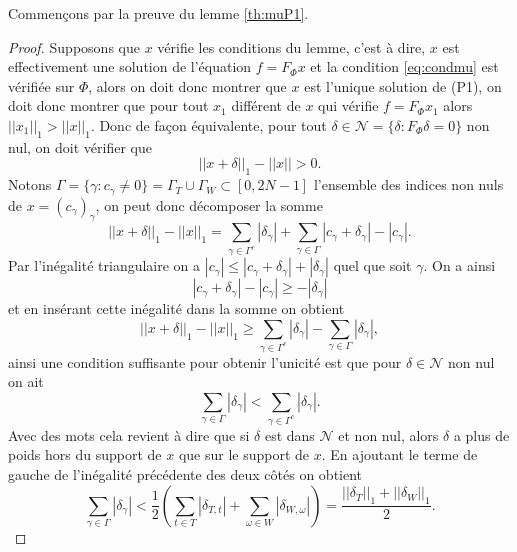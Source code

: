 	Commençons par la preuve du lemme \ref{th:muP1}.
	\begin{proof}
		Supposons que $x$ vérifie les conditions du lemme, c'est à dire, $x$ est effectivement une solution de l'équation $f=F_\Phi x$ et la condition \ref{eq:condmu} est vérifiée sur $\Phi$, alors on doit donc montrer que $x$ est l'unique solution de (P1), on doit donc montrer que pour tout $x_1$ différent de $x$ qui vérifie $f = F_\Phi x_1$ alors $||x_1||_1 > ||x||_1$. 
		Donc de façon équivalente, pour tout $\delta \in \mathcal{N} = \{\delta : F_\Phi \delta = 0\}$ non nul, on doit vérifier que
		\begin{equation}\label{eq:ineqdelta3}
			||x + \delta||_1 - ||x|| > 0.
		\end{equation}
		Notons $\Gamma = \{\gamma : c_\gamma \neq 0\} = \Gamma_T \cup \Gamma_W \subset [0, 2N-1]$ l'ensemble des indices non nuls de $x = (c_\gamma)_\gamma$, 
		on peut donc décomposer la somme
		\begin{equation}
			||x + \delta||_1 - ||x||_1 = \sum_{\gamma \in \Gamma^c} |\delta_\gamma| + \sum_{\gamma \in \Gamma} |c_\gamma + \delta_\gamma| - |c_\gamma|.
		\end{equation}
		Par l'inégalité triangulaire on a $|c_\gamma| \leq |c_\gamma + \delta_\gamma| + |\delta_\gamma|$ quel que soit $\gamma$.
		On a ainsi 
		\begin{equation}
			|c_\gamma + \delta_\gamma| - |c_\gamma| \geq -|\delta_\gamma|
		\end{equation}
		et en insérant cette inégalité dans la somme on obtient
		\begin{equation}
			||x + \delta||_1 - ||x||_1 \geq \sum_{\gamma \in \Gamma^c} |\delta_\gamma| - \sum_{\gamma \in \Gamma} |\delta_\gamma|,
		\end{equation}
		ainsi une condition suffisante pour obtenir l'unicité est que pour $\delta \in \mathcal{N}$ non nul on ait
		\begin{equation}\label{eq:ineqdelta}
			\sum_{\gamma \in \Gamma} |\delta_\gamma| < \sum_{\gamma \in \Gamma^c} |\delta_\gamma|. 
		\end{equation}
		Avec des mots cela revient à dire que si $\delta$ est dans $\mathcal{N}$ et non nul, alors $\delta$ a plus de poids hors du support de $x$ que sur le support de $x$.
		En ajoutant le terme de gauche de l'inégalité précédente des deux côtés on obtient
		\begin{equation}
			\sum_{\gamma \in \Gamma} |\delta_\gamma| < \frac{1}{2} \left(\sum_{t \in T} |\delta_{T, t}| + \sum_{\omega \in W} |\delta_{W, \omega}|\right) = \frac{||\delta_T||_1 + ||\delta_W||_1}{2}.

\end{equation}
\end{proof}
